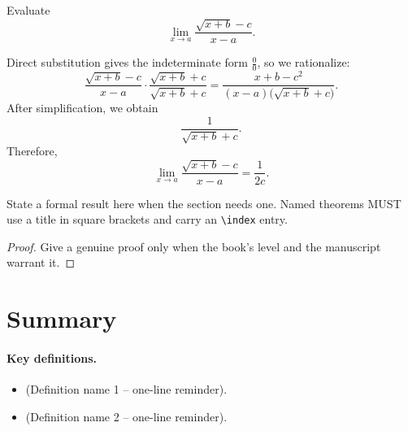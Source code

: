 \begin{workedexample}
\begin{example}
Evaluate
\[
\lim_{x\to a}\frac{\sqrt{x+b}-c}{x-a}.
\]
\end{example}

\begin{solution}
Direct substitution gives the indeterminate form \(\frac{0}{0}\), so we
rationalize:
\[
\frac{\sqrt{x+b}-c}{x-a}
\cdot
\frac{\sqrt{x+b}+c}{\sqrt{x+b}+c}
=
\frac{x+b-c^2}{(x-a)\bigl(\sqrt{x+b}+c\bigr)}.
\]
After simplification, we obtain
\[
\frac{1}{\sqrt{x+b}+c}.
\]
Therefore,
\[
\lim_{x\to a}\frac{\sqrt{x+b}-c}{x-a}
=
\frac{1}{2c}.
\]
\end{solution}
\end{workedexample}


\begin{theorem}
State a formal result here when the section needs one. Named theorems MUST
use a title in square brackets and carry an \texttt{\textbackslash index}
entry.
\end{theorem}

\begin{proof}
Give a genuine proof only when the book's level and the manuscript warrant it.
\end{proof}


\section*{Summary}


\paragraph{Key definitions.}
\begin{itemize}
    \item (Definition name 1 -- one-line reminder).
    \item (Definition name 2 -- one-line reminder).
\end{itemize}

